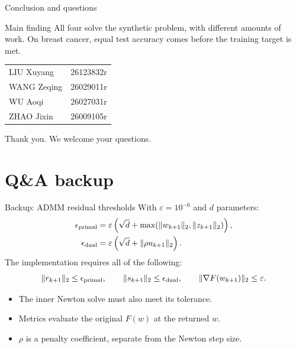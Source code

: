 \documentclass[10pt,aspectratio=169]{beamer}
\begin{document}
\begin{frame}{Conclusion and questions}
\begin{block}{Main finding}
All four solve the synthetic problem, with different amounts of work.
On breast cancer, equal test accuracy comes before the training target is met.
\end{block}
\centering
\medskip
\begin{tabular}{ll}
LIU Xuyang & 26123832r \\
WANG Zeqing & 26029011r \\
WU Aoqi & 26027031r \\
ZHAO Jixin & 26009105r \\
\end{tabular}
\par\bigskip
\large Thank you. We welcome your questions.
\end{frame}

\appendix
\section{Q\&A backup}

\begin{frame}{Backup: ADMM residual thresholds}
With $\varepsilon=10^{-6}$ and $d$ parameters:
\[
\begin{aligned}
\epsilon_{\rm primal}
&=\varepsilon\left(\sqrt d+\max(\|w_{k+1}\|_2,\|z_{k+1}\|_2)\right),\\
\epsilon_{\rm dual}
&=\varepsilon\left(\sqrt d+\|\rho u_{k+1}\|_2\right).
\end{aligned}
\]
The implementation requires all of the following:
\[
\|r_{k+1}\|_2\leq\epsilon_{\rm primal},\qquad
\|s_{k+1}\|_2\leq\epsilon_{\rm dual},\qquad
\|\nabla F(w_{k+1})\|_2\leq\varepsilon.
\]
\begin{itemize}
  \item The inner Newton solve must also meet its tolerance.
  \item Metrics evaluate the original $F(w)$ at the returned $w$.
  \item $\rho$ is a penalty coefficient, separate from the Newton step size.
\end{itemize}
\end{frame}
\end{document}
